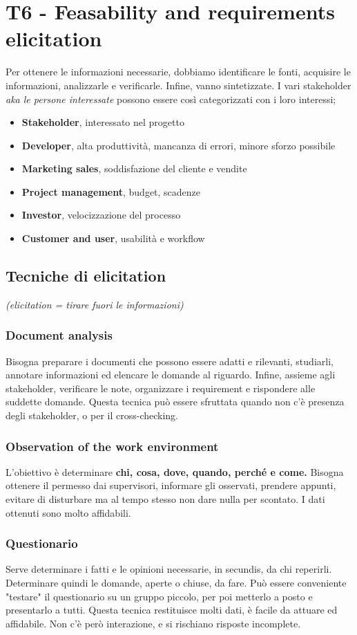 \documentclass[11pt]{article}
\begin{document}
\section{T6 - Feasability and requirements elicitation}
Per ottenere le informazioni necessarie, dobbiamo identificare le fonti, acquisire le informazioni, analizzarle e verificarle. Infine, vanno sintetizzate. I vari stakeholder \textit{aka le persone interessate} possono essere così categorizzati con i loro interessi;
\begin{itemize}
    \item \textbf{Stakeholder}, interessato nel progetto
    \item \textbf{Developer}, alta produttività, mancanza di errori, minore sforzo possibile
    \item \textbf{Marketing sales}, soddisfazione del cliente e vendite
    \item \textbf{Project management}, budget, scadenze
    \item \textbf{Investor}, velocizzazione del processo
    \item \textbf{Customer and user}, usabilità e workflow
\end{itemize}
\subsection{Tecniche di elicitation}
\textit{(elicitation = tirare fuori le informazioni)}
\subsubsection{Document analysis}
Bisogna preparare i documenti che possono essere adatti e rilevanti, studiarli, annotare informazioni ed elencare le domande al riguardo. Infine, assieme agli stakeholder, verificare le note, organizzare i requirement e rispondere alle suddette domande. Questa tecnica può essere sfruttata quando non c'è presenza degli stakeholder, o per il cross-checking.
\subsubsection{Observation of the work environment}
L'obiettivo è determinare \textbf{chi, cosa, dove, quando, perché e come.} Bisogna ottenere il permesso dai supervisori, informare gli osservati, prendere appunti, evitare di disturbare ma al tempo stesso non dare nulla per scontato. I dati ottenuti sono molto affidabili.
\subsubsection{Questionario}
Serve determinare i fatti e le opinioni necessarie, in secundis, da chi reperirli. Determinare quindi le domande, aperte o chiuse, da fare. Può essere conveniente "testare" il questionario su un gruppo piccolo, per poi metterlo a posto e presentarlo a tutti. Questa tecnica restituisce molti dati, è facile da attuare ed affidabile. Non c'è però interazione, e si rischiano risposte incomplete. 
\end{document}
